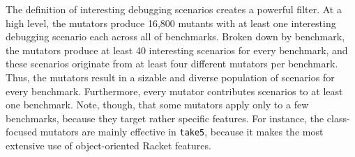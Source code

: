 
The definition of interesting debugging scenarios creates a powerful filter. At
a high level, the mutators produce 16,800 mutants with at least one interesting
debugging scenario each across all of benchmarks.  Broken down by benchmark, the
mutators produce at least 40 interesting scenarios for every benchmark, and
these scenarios originate from at least four different mutators per benchmark.
Thus, the mutators result in a sizable and diverse population of scenarios for
every benchmark.  Furthermore, every mutator contributes scenarios to at least
one benchmark.  Note, though, that some mutators apply only to a few benchmarks,
because they target rather specific features.  For instance, the class-focused
mutators are mainly effective in \texttt{take5}, because it makes the most
extensive use of object-oriented Racket features.

